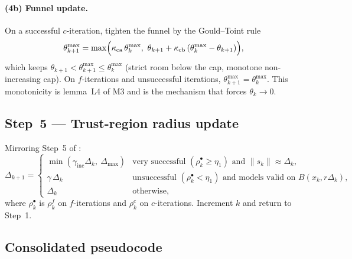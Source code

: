 \paragraph{(4b) Funnel update.} On a successful $c$-iteration, tighten the funnel
by the Gould--Toint rule
\begin{equation}
  \label{eq:funnel-update}
  \theta_{k+1}^{\max}
  = \max\Bigl(\kappa_{\mathrm{ca}}\,\theta_k^{\max},\
                  \theta_{k+1} + \kappa_{\mathrm{cb}}\,(\theta_k^{\max}-\theta_{k+1})\Bigr),
\end{equation}
which keeps $\theta_{k+1}<\theta_{k+1}^{\max}\le\theta_k^{\max}$ (strict room
below the cap, monotone non-increasing cap). On $f$-iterations and unsuccessful
iterations, $\theta_{k+1}^{\max}=\theta_k^{\max}$. This monotonicity is lemma~L4
of M3 and is the mechanism that forces $\theta_k\to0$.

\subsection{Step~5 --- Trust-region radius update}
\label{sec:algo-radius}

Mirroring Step~5 of :
\begin{equation}
  \label{eq:radius-update}
  \Delta_{k+1} =
  \begin{cases}
    \min(\gamma_{\text{inc}}\Delta_k,\ \Delta_{\max})
      & \text{very successful } (\rho^{\bullet}_k\ge\eta_1) \text{ and } \|s_k\|\approx\Delta_k,\\[4pt]
    \gamma\,\Delta_k
      & \text{unsuccessful } (\rho^{\bullet}_k<\eta_1) \text{ and models valid on } B(x_k,r\Delta_k),\\[4pt]
    \Delta_k & \text{otherwise,}
  \end{cases}
\end{equation}
where $\rho^{\bullet}_k$ is $\rho^f_k$ on $f$-iterations and $\rho^c_k$ on
$c$-iterations. Increment $k$ and return to Step~1.

\subsection{Consolidated pseudocode}
\label{sec:algo-pseudocode}

